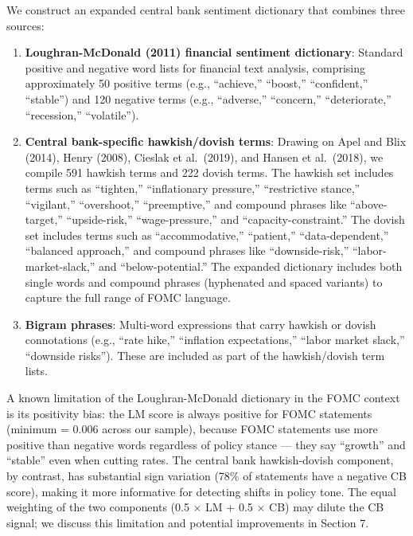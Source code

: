 \documentclass[
]{article}
\begin{document}
We construct an expanded central bank sentiment dictionary that combines
three sources:

\begin{enumerate}
\def\labelenumi{\arabic{enumi}.}
\item
  \textbf{Loughran-McDonald (2011) financial sentiment dictionary}:
  Standard positive and negative word lists for financial text analysis,
  comprising approximately 50 positive terms (e.g., ``achieve,''
  ``boost,'' ``confident,'' ``stable'') and 120 negative terms (e.g.,
  ``adverse,'' ``concern,'' ``deteriorate,'' ``recession,''
  ``volatile'').
\item
  \textbf{Central bank-specific hawkish/dovish terms}: Drawing on Apel
  and Blix (2014), Henry (2008), Cieslak et al.~(2019), and Hansen et
  al.~(2018), we compile 591 hawkish terms and 222 dovish terms. The
  hawkish set includes terms such as ``tighten,'' ``inflationary
  pressure,'' ``restrictive stance,'' ``vigilant,'' ``overshoot,''
  ``preemptive,'' and compound phrases like ``above-target,''
  ``upside-risk,'' ``wage-pressure,'' and ``capacity-constraint.'' The
  dovish set includes terms such as ``accommodative,'' ``patient,''
  ``data-dependent,'' ``balanced approach,'' and compound phrases like
  ``downside-risk,'' ``labor-market-slack,'' and ``below-potential.''
  The expanded dictionary includes both single words and compound
  phrases (hyphenated and spaced variants) to capture the full range of
  FOMC language.
\item
  \textbf{Bigram phrases}: Multi-word expressions that carry hawkish or
  dovish connotations (e.g., ``rate hike,'' ``inflation expectations,''
  ``labor market slack,'' ``downside risks''). These are included as
  part of the hawkish/dovish term lists.
\end{enumerate}

A known limitation of the Loughran-McDonald dictionary in the FOMC
context is its positivity bias: the LM score is always positive for FOMC
statements (minimum = 0.006 across our sample), because FOMC statements
use more positive than negative words regardless of policy stance ---
they say ``growth'' and ``stable'' even when cutting rates. The central
bank hawkish-dovish component, by contrast, has substantial sign
variation (78\% of statements have a negative CB score), making it more
informative for detecting shifts in policy tone. The equal weighting of
the two components (0.5 × LM + 0.5 × CB) may dilute the CB signal; we
discuss this limitation and potential improvements in Section 7.
\end{document}
